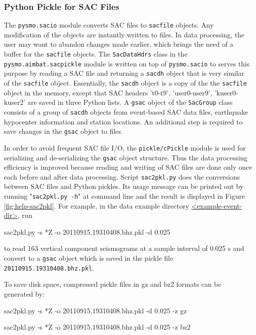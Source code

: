 \documentclass[12pt, titlepage]{article}
\newenvironment{lyxcode}
{\begin{list}{}{
\setlength{\rightmargin}{\leftmargin}
\setlength{\listparindent}{0pt}%
\raggedright
\setlength{\itemsep}{0pt}
\setlength{\parsep}{0pt}
\normalfont\ttfamily}%
 \item[]}
{\end{list}}
\begin{document}
\subsubsection{Python Pickle for SAC Files}

The \texttt{pysmo.sacio} module converts SAC files to \texttt{sacfile} objects. Any modification of the objects are instantly written to files. 
In data processing, the user may want to abandon changes made earlier, which brings the need of a buffer for the  \texttt{sacfile} objects.
The \texttt{SacDataHdrs} class in the \texttt{pysmo.aimbat.sacpickle} module is written on top of \texttt{pysmo.sacio} to serves this purpose by reading a SAC file and returning a \texttt{sacdh} object that is very similar of the \texttt{sacfile} object. 
Essentially, the \texttt{sacdh} object is a copy of the the \texttt{sacfile} object in the memory, except that SAC headers 't0-t9', 'user0-user9', 'kuser0-kuser2' are saved in three Python lists.
A \texttt{gsac} object of the \texttt{SacGroup} class consists of a group of \texttt{sacdh} objects from event-based SAC data files, earthquake hypocenter information and station locations.
An additional step is required to save changes in the \texttt{gsac} object to files.

In order to avoid frequent SAC file I/O, the \texttt{pickle/cPickle} module is used for serializing and de-serializing the \texttt{gsac} object structure.
Thus the data processing efficiency is improved because reading and writing of SAC files are done only once each before and after data processing.
Script \texttt{sac2pkl.py} does the conversions between SAC files and Python pickles. 
Its usage message can be printed out by running "\texttt{sac2pkl.py -h}" at command line and the result is displayed in Figure \ref{fig:help-sac2pkl}.
For example, in the data example directory \url{<example-event-dir>}, run

\begin{lyxcode}
sac2pkl.py -s *Z -o 20110915.19310408.bhz.pkl -d 0.025
\end{lyxcode}

to read 163 vertical component seismograms at a sample interval of 0.025 s and convert to a \texttt{gsac} object which is saved in the pickle file \texttt{20110915.19310408.bhz.pkl}.

To save disk space, compressed pickle files in gz and bz2 formats can be generated by:
\begin{lyxcode}
sac2pkl.py -s *Z -o 20110915.19310408.bhz.pkl -d 0.025 -z gz

sac2pkl.py -s *Z -o 20110915.19310408.bhz.pkl -d 0.025 -z bz2
\end{lyxcode}
\end{document}
